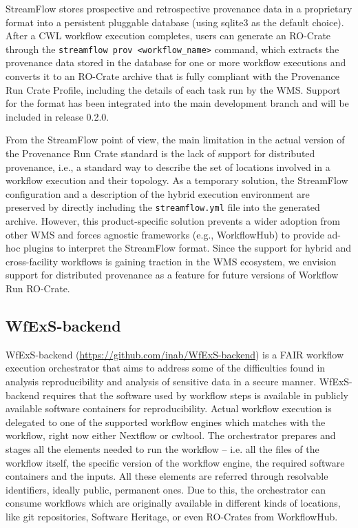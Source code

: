 \documentclass[10pt,letterpaper]{article}
\begin{document}
StreamFlow stores prospective and retrospective provenance data in a proprietary format into a persistent pluggable database (using sqlite3 as the default choice).
After a CWL workflow execution completes, users can generate an RO-Crate through the \texttt{streamflow prov <workflow\_name>}
command, which extracts the provenance data stored in the database for one or more workflow executions and converts it to an RO-Crate archive that is fully compliant with the Provenance Run Crate Profile, including the details of each task run by the WMS.
Support for the format has been integrated into the main development branch and will be included in release 0.2.0.

From the StreamFlow point of view, the main limitation in the actual version of the Provenance Run Crate standard is the lack of support for distributed provenance, i.e., a standard way to describe the set of locations involved in a workflow execution and their topology. As a temporary solution,
the StreamFlow configuration and a description of the hybrid execution environment are preserved by directly including the \texttt{streamflow.yml} file into the generated archive.
However, this product-specific solution prevents a wider adoption from other WMS and forces agnostic frameworks (e.g., WorkflowHub) to provide ad-hoc plugins to interpret the StreamFlow format.
Since the support for hybrid and cross-facility workflows is gaining traction in the WMS ecosystem, we envision support for distributed provenance as a feature for future versions of Workflow Run RO-Crate.

\subsection{WfExS-backend}\label{wfexs}

WfExS-backend (\url{https://github.com/inab/WfExS-backend}) is a FAIR workflow execution orchestrator that aims to address some of the difficulties found in analysis reproducibility and analysis of sensitive data in a secure manner.
WfExS-backend requires that the software used by workflow steps is available in publicly available software containers for reproducibility.
Actual workflow execution is delegated to one of the supported workflow engines which matches with the workflow, right now either Nextflow or cwltool.
The orchestrator prepares and stages all the elements needed to run the workflow -- i.e. all the files of the workflow itself, the specific version of the workflow engine, the required software containers and the inputs.
All these elements are referred through resolvable identifiers, ideally public, permanent ones.
Due to this, the orchestrator can consume workflows which are originally available in different kinds of locations, like git repositories, Software Heritage, or even RO-Crates from WorkflowHub.
\end{document}
